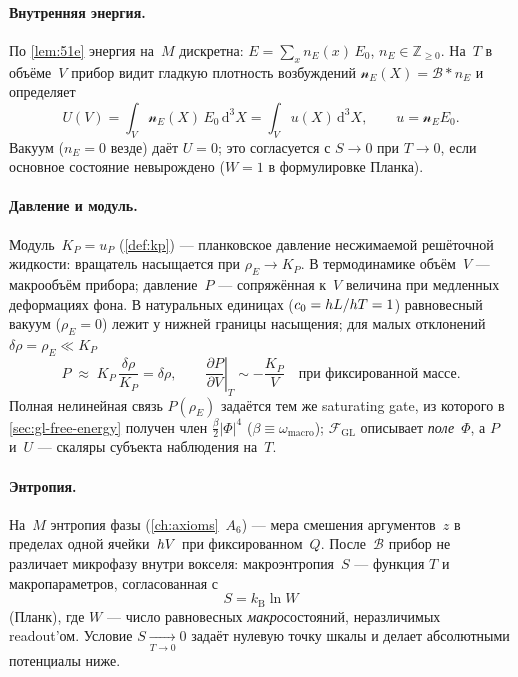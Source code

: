 \paragraph{Внутренняя энергия.}
По \cref{lem:51e} энергия на~$M$ дискретна: $E=\sum_x n_E(x)\,E_0$,
$n_E\in\mathbb{Z}_{\ge 0}$.
На~$T$ в объёме~$V$ прибор видит гладкую плотность возбуждений
$\mathscr{n}_E(X)=\mathcal{B}*n_E$ и определяет
\begin{equation}
\label{eq:internal-energy}
  U(V)=\int_V \mathscr{n}_E(X)\,E_0\,\mathrm{d}^3X
  = \int_V u(X)\,\mathrm{d}^3X,
  \qquad u=\mathscr{n}_E E_0.
\end{equation}
Вакуум ($n_E=0$ везде) даёт $U=0$; это согласуется с $S\to 0$ при $T\to 0$,
если основное состояние невырождено ($W=1$ в формулировке Планка).

\paragraph{Давление и модуль.}
Модуль~$K_P=u_P$ (\cref{def:kp}) --- планковское давление несжимаемой решёточной жидкости:
вращатель насыщается при $\rho_E\to K_P$.
В термодинамике объём~$V$ --- макрообъём прибора; давление~$P$ --- сопряжённая
к~$V$ величина при медленных деформациях фона.
В натуральных единицах ($c_0=hL/hT=1$) равновесный вакуум ($\rho_E=0$)
лежит у нижней границы насыщения; для малых отклонений $\delta\rho=\rho_E\ll K_P$
\begin{equation}
\label{eq:pressure-linear}
  P \;\approx\; K_P\,\frac{\delta\rho}{K_P} = \delta\rho,
  \qquad
  \left.\frac{\partial P}{\partial V}\right|_{T}
  \sim -\frac{K_P}{V}\quad\text{при фиксированной массе.}
\end{equation}
Полная нелинейная связь $P(\rho_E)$ задаётся тем же saturating gate,
из которого в \cref{sec:gl-free-energy} получен член $\tfrac{\beta}{2}|\Phi|^4$
($\beta\equiv\omega_{\mathrm{macro}}$);
$\mathcal{F}_{\mathrm{GL}}$ описывает \emph{поле}~$\Phi$, а $P$ и~$U$ --- скаляры
субъекта наблюдения на~$T$.

\paragraph{Энтропия.}
На~$M$ энтропия фазы (\cref{ch:axioms}~$A_6$) --- мера смешения аргументов~$z$
в пределах одной ячейки~$hV$ при фиксированном~$Q$.
После~$\mathcal{B}$ прибор не различает микрофазу внутри вокселя:
макроэнтропия~$S$ --- функция $T$ и макропараметров, согласованная с
\[
  S = k_{\mathrm{B}}\ln W
\]
(Планк), где $W$ --- число равновесных \emph{макро}состояний, неразличимых readout'ом.
Условие $S\xrightarrow[T\to 0]{}0$ задаёт нулевую точку шкалы и делает
абсолютными потенциалы ниже.


